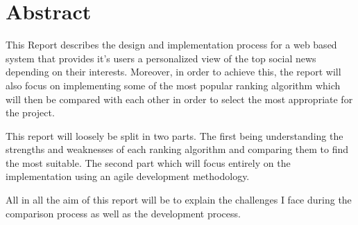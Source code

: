
\chapter*{Abstract}

This Report describes the design and implementation process for a web based system that provides it's users a personalized view of the top social news depending on their interests. Moreover, in order to achieve this, the report will also focus on implementing some of the most popular ranking algorithm which will then be compared with each other in order to select the most appropriate for the project.

This report will loosely be split in two parts. The first being understanding the strengths and weaknesses of each ranking algorithm and comparing them to find the most suitable. The second part which will focus entirely on the implementation using an agile development methodology.

All in all the aim of this report will be to explain the challenges I face during the comparison process as well as the development process.

